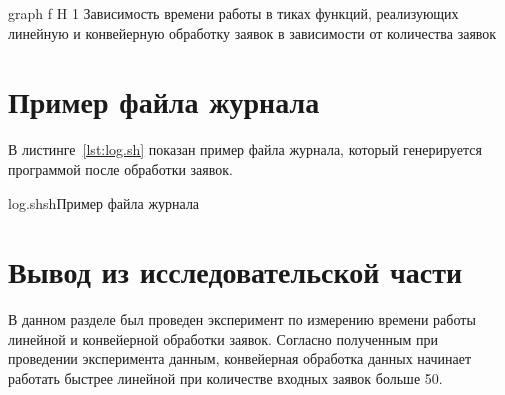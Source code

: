     {graph}
    {f}
    {H}
    {1\textwidth}
    {Зависимость времени работы в тиках функций, реализующих линейную и конвейерную обработку заявок в зависимости от количества заявок}
    
\section{Пример файла журнала}

В листинге~\ref{lst:log.sh} показан пример файла журнала, который генерируется программой после обработки заявок.

{log.sh}{sh}{Пример файла журнала}

\section{Вывод из исследовательской части}

В данном разделе был проведен эксперимент по измерению времени работы линейной и конвейерной обработки заявок. 
Согласно полученным при проведении эксперимента данным, конвейерная обработка данных начинает работать быстрее линейной при количестве входных заявок больше 50.